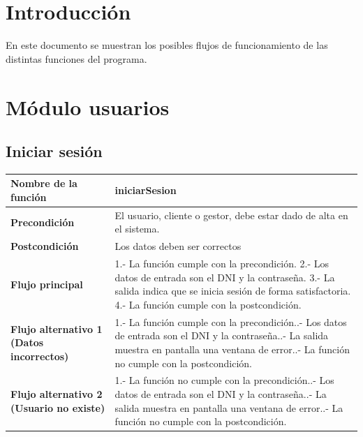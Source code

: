 \documentclass[12pt]{article}
\begin{document}
\section*{Introducción}
En este documento se muestran los posibles flujos de funcionamiento de las distintas funciones del programa.

\section{Módulo usuarios}
\subsection{Iniciar sesión}
\begin{table}[H]
    \centering
    \begin{tabularx}{\textwidth}{|>{\bfseries}X|X|}
        \hline
        Nombre de la función                                        & iniciarSesion                                                        \\
        \hline
        Precondición                                                & El usuario, cliente o gestor, debe estar dado de alta en el sistema. \\
        \hline
        Postcondición                                               & Los datos deben ser correctos                                        \\
        \hline
        Flujo principal                                             &
        1.- La función cumple con la precondición.
        2.- Los datos de entrada son el DNI y la contraseña.
        3.- La salida indica que se inicia sesión de forma satisfactoria.
        4.- La función cumple con la postcondición.
        \\
        \hline
        \makecell{Flujo alternativo 1 \newline (Datos incorrectos)} &
        1.- La función cumple con la precondición.\newline
        2.- Los datos de entrada son el DNI y la contraseña.\newline
        3.- La salida muestra en pantalla una ventana de error.\newline
        4.- La función no cumple con la postcondición.\newline                                                                             \\
        \hline
        Flujo alternativo 2 \newline (Usuario no existe)            &
        1.- La función no cumple con la precondición.\newline
        2.- Los datos de entrada son el DNI y la contraseña.\newline
        3.- La salida muestra en pantalla una ventana de error.\newline
        4.- La función no cumple con la postcondición.\newline                                                                             \\
        \hline
    \end{tabularx}
\end{table}
\end{document}
